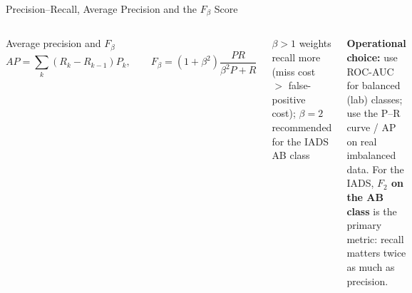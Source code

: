 \documentclass[aspectratio=169,10pt,t]{beamer}
\begin{document}
\begin{frame}{Precision--Recall, Average Precision and the $F_\beta$ Score}
\begin{columns}[T]
\begin{fbx}{Average precision and $F_\beta$}\[AP=\sum_k(R_k-R_{k-1})P_k,\qquad F_\beta=(1+\beta^2)\frac{PR}{\beta^2P+R}\]\end{fbx}
\begin{tl}\item $\beta>1$ weights recall more (miss cost $>$ false-positive cost); \textbf{$\beta=2$} recommended for the IADS AB class\end{tl}
\begin{rbox}\scriptsize\textbf{Operational choice:} use ROC-AUC for balanced (lab) classes; use the P--R curve / AP on real imbalanced data. For the IADS, \textbf{$F_2$ on the AB class} is the primary metric: recall matters twice as much as precision.\end{rbox}
\end{columns}
\end{frame}
\end{document}
